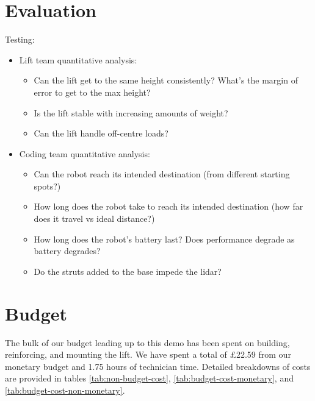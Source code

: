 \documentclass{article}
\begin{document}
\section{Evaluation}
Testing:
\begin{itemize}
\item Lift team quantitative analysis:
  \begin{itemize}
  \item Can the lift get to the same height consistently? What's the margin of error to get to the max height?
  \item Is the lift stable with increasing amounts of weight?
  \item Can the lift handle off-centre loads?
  \end{itemize}
\item Coding team quantitative analysis:
  \begin{itemize}
  \item Can the robot reach its intended destination (from different starting spots?)
  \item How long does the robot take to reach its intended destination (how far does it travel vs ideal distance?)
  \item How long does the robot's battery last? Does performance degrade as battery degrades?
  \item Do the struts added to the base impede the lidar? 
  \end{itemize}
\end{itemize}
  
\section{Budget}
The bulk of our budget leading up to this demo has been spent on building, reinforcing, and mounting the lift. We have spent a total of \pounds 22.59 from our monetary budget and 1.75 hours of technician time. Detailed breakdowns of costs are provided in tables \ref{tab:non-budget-cost}, \ref{tab:budget-cost-monetary}, and \ref{tab:budget-cost-non-monetary}.
\end{document}
